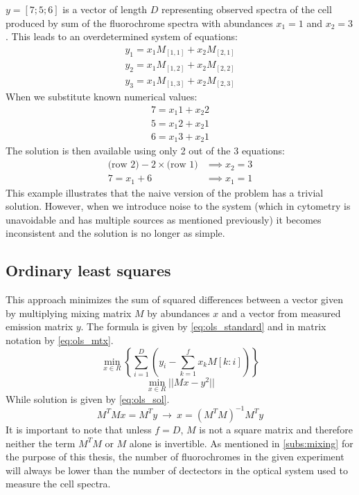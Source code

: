 $y=\left[7;5;6\right]$ is a vector of length $D$ representing observed spectra of the cell produced by sum of the fluorochrome spectra with abundances $x_1=1$ and $x_2=3$.
This leads to an overdetermined system of equations:
\[\begin{aligned} 
y_1=x_1 M_{\left[1,1\right]}+x_2 M_{\left[2,1\right]} \\ 
y_2=x_1 M_{\left[1,2\right]}+x_2 M_{\left[2,2\right]} \\ 
y_3=x_1 M_{\left[1,3\right]}+x_2 M_{\left[2,3\right]}
\end{aligned}\]
When we substitute known numerical values:
\[\begin{aligned} 
7=x_1 1+x_2 2 \\ 
5=x_1 2+x_2 1\\ 
6=x_1 3+x_2 1
\end{aligned}\]
The solution is then available using only 2 out of the 3 equations:
\[\begin{aligned} 
\text{(row 2)}-2\times\text{(row 1)} &\implies x_2=3 \\
7=x_1+6&\implies x_1=1
\end{aligned}\]
This example illustrates that the naive version of the problem has a trivial solution. 
However, when we introduce noise to the system (which in cytometry is unavoidable and has multiple sources as mentioned previously) it becomes inconsistent and the solution is no longer as simple.

\subsection{Ordinary least squares}
\label{subs:ols}
 This approach minimizes the sum of squared differences between a vector given by multiplying mixing matrix $M$ by abundances $x$ and a vector from measured emission matrix $y$. The formula is given by \cref{eq:ols_standard} and in matrix notation by \cref{eq:ols_mtx}.
\begin{equation}
\underset{x\in R}{\min}{\left\{\sum_{i=1}^{D}\left(y_i-\sum_{k=1}^{f}{x_k M\left[k:i\right]}\right)\right\}}
\label{eq:ols_standard}
\end{equation}
\begin{equation}
\underset{x\in R}{\min}{||Mx-y^2||}
\label{eq:ols_mtx}
\end{equation}
While solution is given by \cref{eq:ols_sol}.
\begin{equation}
M^TMx=M^Ty\ \rightarrow\ x=\left(M^TM\right)^{-1}M^Ty
\label{eq:ols_sol}
\end{equation}
It is important to note that unless $f=D$, $M$ is not a square matrix and therefore neither the term $M^TM$ or $M$ alone is invertible. As mentioned in \cref{subs:mixing} for the purpose of this thesis, the number of fluorochromes in the given experiment will always be lower than the number of dectectors in the optical system used to measure the cell spectra.

